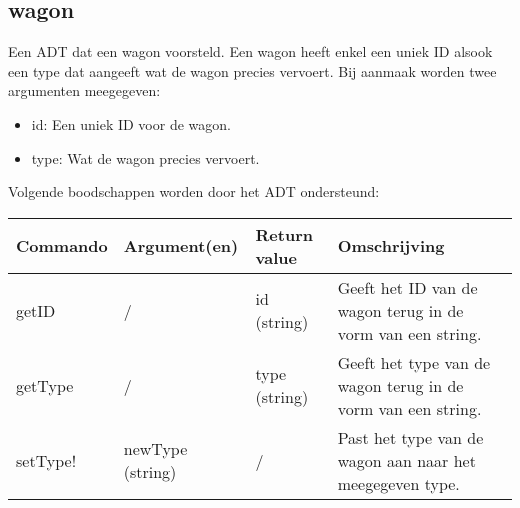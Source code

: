 \documentclass{article}
\begin{document}
\subsection{wagon}
Een ADT dat een wagon voorsteld. Een wagon heeft enkel een uniek ID alsook een type dat aangeeft wat de wagon precies vervoert. Bij aanmaak worden twee argumenten meegegeven:
\begin{itemize}
  \item id: Een uniek ID voor de wagon.
  \item type: Wat de wagon precies vervoert.
\end{itemize}
Volgende boodschappen worden door het ADT ondersteund:
\begin{center}
    \begin{tabular}{ | l | l | l | p{8cm} |}
    \hline
    Commando & Argument(en) & Return value & Omschrijving \\ \hline
    getID & / & id (string) & Geeft het ID van de wagon terug in de vorm van een string. \\ \hline
    getType & / & type (string) & Geeft het type van de wagon terug in de vorm van een string. \\ \hline
    setType! & newType (string) & / & Past het type van de wagon aan naar het meegegeven type. \\ \hline
    \end{tabular}
\end{center}
\end{document}
